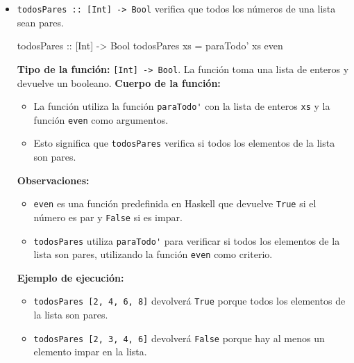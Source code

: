 \documentclass{article}
\begin{document}
\begin{itemize}
    \item 
\verb|todosPares :: [Int] -> Bool| verifica que todos los números de una lista sean pares.
\begin{haskell}
todosPares :: [Int] -> Bool
todosPares xs = paraTodo' xs even
\end{haskell}
\textbf{Tipo de la función:} \verb|[Int] -> Bool|. La función toma una lista de enteros y devuelve un booleano.
\textbf{Cuerpo de la función:}
\begin{itemize}
\item La función utiliza la función \verb|paraTodo'| con la lista de enteros \verb|xs| y la función \verb|even| como argumentos.
\item Esto significa que \verb|todosPares| verifica si todos los elementos de la lista son pares.
\end{itemize}
\textbf{Observaciones:}
\begin{itemize}
\item \verb|even| es una función predefinida en Haskell que devuelve \verb|True| si el número es par y \verb|False| si es impar.
\item \verb|todosPares| utiliza \verb|paraTodo'| para verificar si todos los elementos de la lista son pares, utilizando la función \verb|even| como criterio.
\end{itemize}
\textbf{Ejemplo de ejecución:}
\begin{itemize}
\item \verb|todosPares [2, 4, 6, 8]| devolverá \verb|True| porque todos los elementos de la lista son pares.
\item \verb|todosPares [2, 3, 4, 6]| devolverá \verb|False| porque hay al menos un elemento impar en la lista.
\end{itemize}


\end{itemize}
\end{document}
